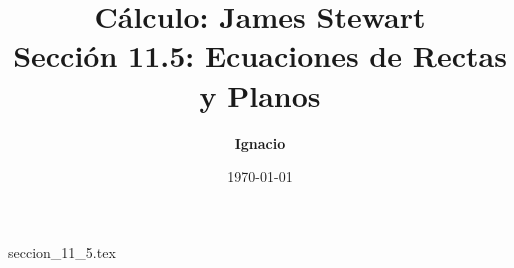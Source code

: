 \documentclass[11pt,spanish,oneside]{report}
\title{\textbf{Cálculo: James Stewart} \\ \Large Sección 11.5: Ecuaciones de Rectas y Planos}
\author{\textbf{Ignacio}}
\date{\today}
\begin{document}
\maketitle

{seccion_11_5.tex}
\end{document}
